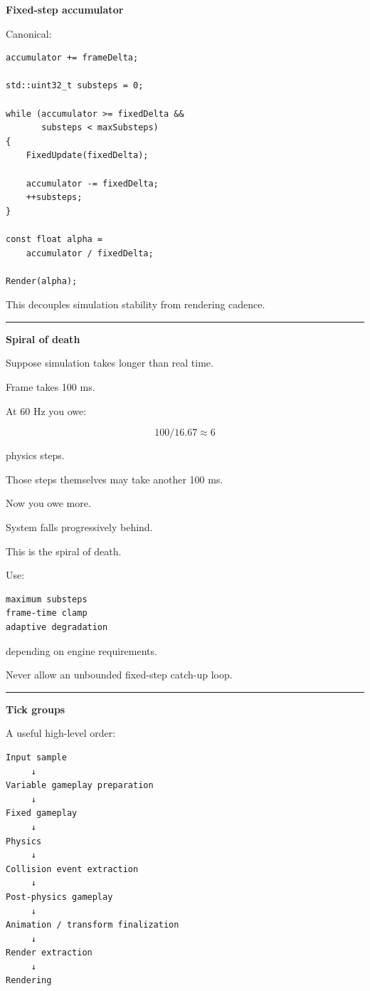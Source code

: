 \textbf{Fixed-step accumulator}

Canonical:

\begin{verbatim}
accumulator += frameDelta;

std::uint32_t substeps = 0;

while (accumulator >= fixedDelta &&
       substeps < maxSubsteps)
{
    FixedUpdate(fixedDelta);

    accumulator -= fixedDelta;
    ++substeps;
}

const float alpha =
    accumulator / fixedDelta;

Render(alpha);
\end{verbatim}

This decouples simulation stability from rendering cadence.

\begin{center}\rule{0.5\linewidth}{0.5pt}\end{center}

\textbf{Spiral of death}

Suppose simulation takes longer than real time.

Frame takes 100 ms.

At 60 Hz you owe:

\[
100/16.67\approx6
\]

physics steps.

Those steps themselves may take another 100 ms.

Now you owe more.

System falls progressively behind.

This is the spiral of death.

Use:

\begin{verbatim}
maximum substeps
frame-time clamp
adaptive degradation
\end{verbatim}

depending on engine requirements.

Never allow an unbounded fixed-step catch-up loop.

\begin{center}\rule{0.5\linewidth}{0.5pt}\end{center}

\textbf{Tick groups}

A useful high-level order:

\begin{verbatim}
Input sample
     ↓
Variable gameplay preparation
     ↓
Fixed gameplay
     ↓
Physics
     ↓
Collision event extraction
     ↓
Post-physics gameplay
     ↓
Animation / transform finalization
     ↓
Render extraction
     ↓
Rendering
\end{verbatim}

